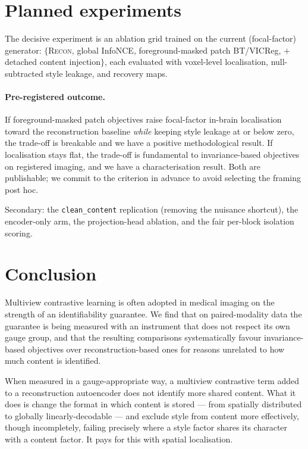 \documentclass[11pt]{article}
\begin{document}
\section{Planned experiments}
\label{sec:next}

The decisive experiment is an ablation grid trained on the current (focal-factor)
generator: $\{$\textsc{Recon}, global InfoNCE, foreground-masked patch
BT/VICReg, $+$ detached content injection$\}$, each evaluated with voxel-level
localisation, null-subtracted style leakage, and recovery maps.

\paragraph{Pre-registered outcome.} If foreground-masked patch objectives raise
focal-factor in-brain localisation toward the reconstruction baseline
\emph{while} keeping style leakage at or below zero, the trade-off is breakable
and we have a positive methodological result. If localisation stays flat, the
trade-off is fundamental to invariance-based objectives on registered imaging,
and we have a characterisation result. Both are publishable; we commit to the
criterion in advance to avoid selecting the framing post hoc.

Secondary: the \texttt{clean\_content} replication (removing the nuisance
shortcut), the encoder-only arm, the projection-head ablation, and the fair
per-block isolation scoring.

\section{Conclusion}

Multiview contrastive learning is often adopted in medical imaging on the
strength of an identifiability guarantee. We find that on paired-modality data
the guarantee is being measured with an instrument that does not respect its own
gauge group, and that the resulting comparisons systematically favour
invariance-based objectives over reconstruction-based ones for reasons unrelated
to how much content is identified.

When measured in a gauge-appropriate way, a multiview contrastive term added to
a reconstruction autoencoder does not identify more shared content. What it does
is change the format in which content is stored --- from spatially distributed
to globally linearly-decodable --- and exclude style from content more
effectively, though incompletely, failing precisely where a style factor shares
its character with a content factor. It pays for this with spatial localisation.
\end{document}
